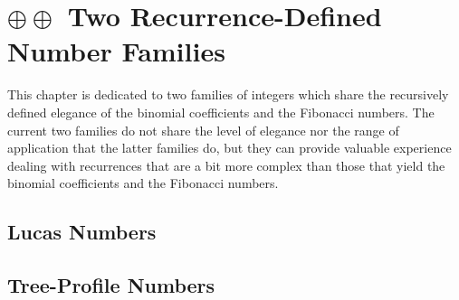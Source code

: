 
\chapter{$\oplus \oplus$ Two Recurrence-Defined Number Families}
\label{ch:recurrent-numbers-appendix}


\noindent {}

\bigskip

\noindent
This chapter is dedicated to two families of integers which share the recursively defined elegance of the binomial coefficients and the Fibonacci numbers.  The current two families do not share the level of elegance nor the range of application that the latter families do, but they can provide valuable experience dealing with recurrences that are a bit more complex than those that yield the binomial coefficients and the Fibonacci numbers.


\section{Lucas Numbers}
\label{sec:Lucas-numbers}




\section{Tree-Profile Numbers}
\label{sec:Tree-Profile-numbers}


